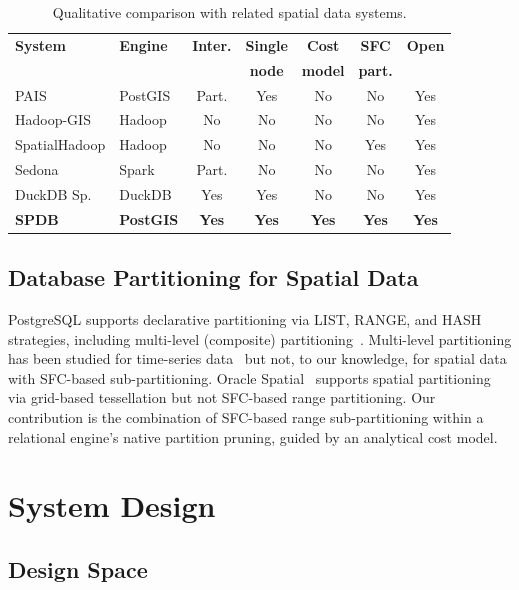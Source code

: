 \documentclass[sigconf]{acmart}
\begin{document}
\begin{table}[t]
\centering
\caption{Qualitative comparison with related spatial data systems.}
\label{tab:comparison}
\scriptsize
\begin{tabular}{@{}p{1.5cm}p{1.0cm}ccccc@{}}
\toprule
\textbf{System} & \textbf{Engine} & \textbf{Inter.} & \textbf{Single} & \textbf{Cost} & \textbf{SFC} & \textbf{Open} \\
& & & \textbf{node} & \textbf{model} & \textbf{part.} & \\
\midrule
PAIS & PostGIS & Part. & Yes & No & No & Yes \\
Hadoop-GIS & Hadoop & No & No & No & No & Yes \\
SpatialHadoop & Hadoop & No & No & No & Yes & Yes \\
Sedona & Spark & Part. & No & No & No & Yes \\
DuckDB Sp. & DuckDB & Yes & Yes & No & No & Yes \\
\textbf{SPDB} & \textbf{PostGIS} & \textbf{Yes} & \textbf{Yes} & \textbf{Yes} & \textbf{Yes} & \textbf{Yes} \\
\bottomrule
\end{tabular}
\end{table}

\subsection{Database Partitioning for Spatial Data}

PostgreSQL supports declarative partitioning via LIST, RANGE, and HASH strategies, including multi-level (composite) partitioning~\cite{pg_partitioning}.
Multi-level partitioning has been studied for time-series data~\cite{timescaledb} but not, to our knowledge, for spatial data with SFC-based sub-partitioning.
Oracle Spatial~\cite{oracle_spatial} supports spatial partitioning via grid-based tessellation but not SFC-based range partitioning.
Our contribution is the combination of SFC-based range sub-partitioning within a relational engine's native partition pruning, guided by an analytical cost model.

\section{System Design}
\label{sec:design}

\subsection{Design Space}
\end{document}
